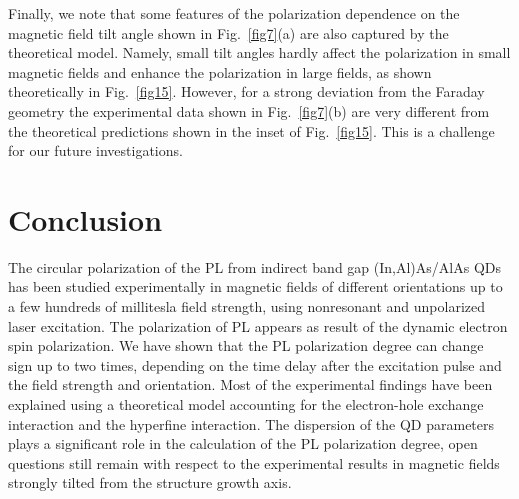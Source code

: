 \documentclass[twocolumn,showpacs,preprintnumbers,amsmath,amssymb,aps]{revtex4-1}
\begin{document}
Finally, we note that some features of the polarization dependence
on the magnetic field tilt angle shown in Fig.~\ref{fig7}(a) are
also captured by the theoretical model. Namely, small tilt angles
hardly affect the polarization in small magnetic fields and enhance
the polarization in large fields, as shown theoretically in
Fig.~\ref{fig15}. However, for a strong deviation from the Faraday
geometry the experimental data shown in Fig.~\ref{fig7}(b) are very
different from the theoretical predictions shown in the inset of
Fig.~\ref{fig15}. This is a challenge for our future investigations.


\section{Conclusion}
\label{sec:conclusions}

The circular polarization of the PL from indirect band gap
(In,Al)As/AlAs QDs has been studied experimentally in magnetic
fields of different orientations up to a few hundreds of millitesla
field strength, using nonresonant and unpolarized laser excitation.
The polarization of PL appears as result of the dynamic electron
spin polarization. We have shown that the PL polarization degree can
change sign up to two times, depending on the time delay after the
excitation pulse and the field strength and orientation. Most of the
experimental findings have been explained using a theoretical model
accounting for the electron-hole exchange interaction and the
hyperfine interaction. The dispersion of the QD parameters plays a
significant role in the calculation of the PL polarization degree,
open questions still remain with respect to the experimental results
in magnetic fields strongly tilted from the structure growth axis.

\end{document}
